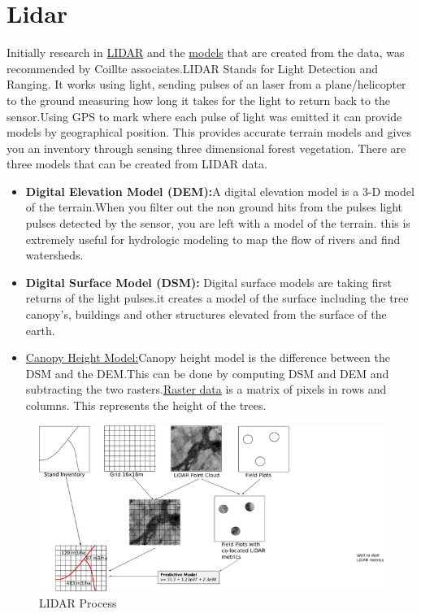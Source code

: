 \documentclass[a4paper,11pt,twoside]{report}
\begin{document}
\section{Lidar}
Initially research in \href{https://oceanservice.noaa.gov/facts/lidar.html}{LIDAR} and the \href{https://oceanservice.noaa.gov/facts/lidar.html}{models} that are created from the data, was recommended by Coillte associates.LIDAR Stands for Light Detection and Ranging. It works using light, sending pulses of an laser from a plane/helicopter to the ground  measuring how long it takes for the light to return back to the sensor.Using GPS to mark where each pulse of light was emitted it can provide models by geographical position.
This provides accurate terrain models and gives you an inventory through sensing three dimensional forest vegetation.
There are three models that can be created from LIDAR data.
\begin{itemize}
    \item \textbf{Digital Elevation Model (DEM):}A digital elevation model is a 3-D model of the terrain.When you filter out the non ground hits from the pulses light pulses detected by the sensor, you are left with a model of the terrain. this is extremely useful for hydrologic modeling to map the flow of rivers and find watersheds. 
    \item \textbf{Digital Surface Model (DSM):} Digital surface models are taking first returns of the light pulses.it creates a model of the surface including the tree canopy's, buildings and other structures elevated from the surface of the earth.
    \item \href{https://rapidlasso.com/2014/11/04/rasterizing-perfect-canopy-height-models-from-lidar/}{Canopy Height Model:}Canopy height model is the difference between the DSM and the DEM.This can be done by computing DSM and DEM and subtracting the two rasters.\href{http://desktop.arcgis.com/en/arcmap/10.3/manage-data/raster-and-images/what-is-raster-data.htm}{Raster data} is a matrix of pixels in rows and columns. This represents the height of the trees.
\end{itemize}

\begin{figure}[hb]
  \centering
  \includegraphics[width=1\linewidth]{Images/LIDAR.png}
  \caption{LIDAR Process}
  \label{fig:DBH_Species}
  \end{figure}
  
\end{document}
